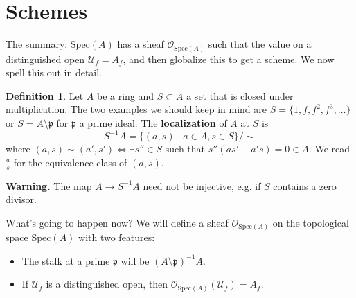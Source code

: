 \documentclass{article}
\theoremstyle{definition}
\newtheorem{defn}{Definition}[section]
\begin{document}
\section{Schemes}
The summary: $\text{Spec}(A)$ has a sheaf $\mathcal{O}_{\text{Spec}(A)}$ such that the value on a distinguished open $\mathcal{U}_f = A_f$, and then globalize this to get a scheme. We now spell this out in detail.

\begin{defn}
    Let $A$ be a ring and $S \subset A$ a set that is closed under multiplication. The two examples we should keep in mind are $S = \{1,f,f^2,f^3,\ldots\}$ or $S = A\setminus \mathfrak{p}$ for $\mathfrak{p}$ a prime ideal. The \textbf{localization} of $A$ at $S$ is \[
    S^{-1}A = \{(a,s) \mid a \in A, s \in S\}/\sim
    \]
    where $(a,s) \sim (a',s') \iff \exists s'' \in S$ such that $s''(as'-a's) = 0 \in A$. We read $\frac{a}{s}$ for the equivalence class of $(a,s)$.
\end{defn}

\textbf{Warning.} The map $A \to S^{-1}A$ need not be injective, e.g. if $S$ contains a zero divisor.
\vspace{1mm}
 
What's going to happen now? We will define a sheaf $\mathcal{O}_{\text{Spec}(A)}$ on the topological space $\text{Spec}(A)$ with two features: 
\begin{itemize}
    \item The stalk at a prime $\mathfrak{p}$ will be $(A\setminus \mathfrak{p})^{-1}A$.
    \item If $\mathcal{U}_f$ is a distinguished open, then $\mathcal{O}_{\text{Spec}(A)}(\mathcal{U}_f) = A_f$.
\end{itemize}
\vspace{1mm}
 
\end{document}
